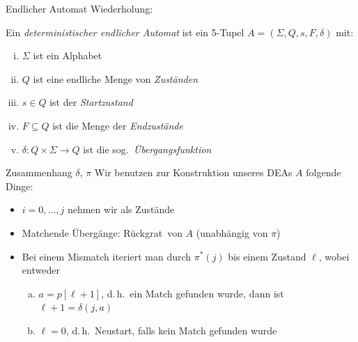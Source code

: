 \documentclass[xcolor=dvipsnames, aspectratio=169]{beamer}
\begin{document}
\begin{frame}{Endlicher Automat}
Wiederholung:\medskip

\begin{defi}
Ein \emph{deterministischer endlicher Automat} ist ein 5-Tupel $A=(\Sigma, Q, s, F, \delta)$ mit:
\begin{enumerate}[(i)]
\item $\Sigma$ ist ein Alphabet
\item $Q$ ist eine endliche Menge von \emph{Zuständen}
\item $s\in Q$ ist der \emph{Startzustand}
\item $F\subseteq Q$ ist die Menge der \emph{Endzustände} 
\item $\delta\colon Q\times\Sigma\to Q$ ist die sog.\ \emph{Übergangsfunktion}
\end{enumerate}
\end{defi}
\end{frame}

\begin{frame}{Zusammenhang $\delta$, $\pi$}
Wir benutzen zur Konstruktion unseres DEAs $A$ folgende Dinge:

\begin{itemize}
\item $i=0,\dots,j$ nehmen wir als Zustände
\item Matchende Übergänge: \glqq Rückgrat\grqq\ von $A$ (unabhängig von $\pi$)\pause
\item Bei einem Mismatch iteriert man durch $\pi^*(j)$ bis einem Zustand $\ell$, wobei entweder

\begin{enumerate}[(a)]
\item $a=p[\ell+1]$, d.\,h.\ ein Match gefunden wurde, dann ist $\ell+1=\delta(j,a)$\medskip\pause
\item $\ell=0$, d.\,h.\ Neustart, falls kein Match gefunden wurde
\end{enumerate}
\end{itemize}
\end{frame}
\end{document}
